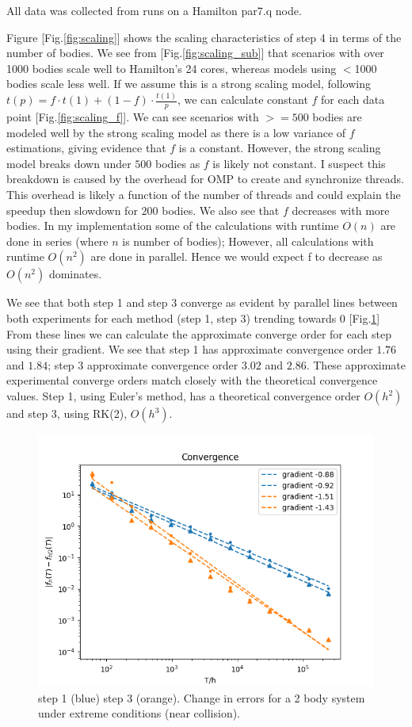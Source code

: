 \documentclass{article}
\begin{document}
All data was collected from runs on a Hamilton par7.q node.

Figure [Fig.\ref{fig:scaling}] shows the scaling characteristics of step 4 in terms of the number of bodies. 
We see from [Fig.\ref{fig:scaling_sub}] that scenarios with over 1000 bodies scale well to Hamilton's 24 cores, whereas models using $<$1000 bodies scale less well. 
If we assume this is a strong scaling model, following $t(p) = f \cdot t(1) + (1-f)\cdot \frac{t(1)}{p}$, we can calculate constant $f$ for each data point [Fig.\ref{fig:scaling_f}]. We can see scenarios with $>=500$ bodies are modeled well by the strong scaling model as there is a low variance of $f$ estimations, giving evidence that $f$ is a constant. 
However, the strong scaling model breaks down under $500$ bodies as $f$ is likely not constant. 
I suspect this breakdown is caused by the overhead for OMP to create and synchronize threads. 
This overhead is likely a function of the number of threads and could explain the speedup then slowdown for $200$ bodies.
We also see that $f$ decreases with more bodies. In my implementation some of the calculations with runtime $O(n)$ are done in series (where $n$ is number of bodies); However, all calculations with runtime $O(n^2)$ are done in parallel. Hence we would expect f to decrease as $O(n^2)$ dominates.


We see that both step 1 and step 3 converge as evident by parallel lines between both experiments for each method (step 1, step 3) trending towards 0 [Fig.\ref{fig:convergence}] From these lines we can calculate the approximate converge order for each step using their gradient. We see that step 1 has approximate convergence order $1.76$ and $1.84$; step 3 approximate convergence order $3.02$ and $2.86$. These approximate experimental converge orders match closely with the theoretical convergence values. Step 1, using Euler's method, has a theoretical convergence order $O(h^2)$ and step 3, using RK(2), $O(h^3)$. 


\begin{figure}[h!]
  \begin{center}
  \includegraphics[scale=0.6]{convergence.png}
    \caption{step 1 (blue) step 3 (orange). Change in errors for a 2 body system under extreme conditions (near collision).}
    \label{fig:convergence}
  \end{center}
  \end{figure}


 
\end{document}
